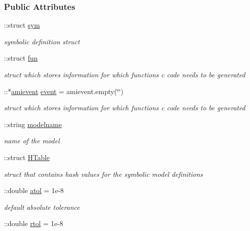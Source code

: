 \subsubsection*{Public Attributes}
\begin{DoxyCompactItemize}
\item 
\+::struct \hyperlink{classamimodel_a3c48fff3d28406486a4f1b5e18da7ca6}{sym}
\begin{DoxyCompactList}\small\item\em symbolic definition struct \end{DoxyCompactList}\item 
\+::struct \hyperlink{classamimodel_a743fa290dbc0a67a3843d5ab0426e9b4}{fun}
\begin{DoxyCompactList}\small\item\em struct which stores information for which functions c code needs to be generated \end{DoxyCompactList}\item 
\+::$\ast$\hyperlink{classamievent}{amievent} \hyperlink{classamimodel_a3b65133bb9997cd1ccf311af0927fc9e}{event} = amievent.\+empty(\char`\"{}\char`\"{})
\begin{DoxyCompactList}\small\item\em struct which stores information for which functions c code needs to be generated \end{DoxyCompactList}\item 
\+::string \hyperlink{classamimodel_a71bca9c21a6de42d8079ade31cb61044}{modelname}
\begin{DoxyCompactList}\small\item\em name of the model \end{DoxyCompactList}\item 
\+::struct \hyperlink{classamimodel_aafe6335df413dd688a2f44efba012cf1}{H\+Table}
\begin{DoxyCompactList}\small\item\em struct that contains hash values for the symbolic model definitions \end{DoxyCompactList}\item 
\+::double \hyperlink{classamimodel_a0c5f3dcf809a17b895fe12fc91272349}{atol} = 1e-\/8
\begin{DoxyCompactList}\small\item\em default absolute tolerance \end{DoxyCompactList}\item 
\+::double \hyperlink{classamimodel_a7978e9a4674f869e6b2950e2f6262ca5}{rtol} = 1e-\/8

\end{DoxyCompactItemize}
